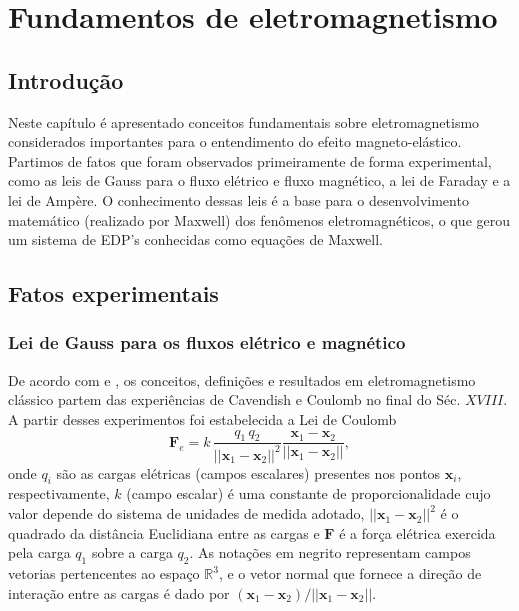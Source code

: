 \chapter{Fundamentos de eletromagnetismo}\label{sec.fund_eletr}

\section{Introdução}
Neste cap\'itulo \'e apresentado conceitos fundamentais sobre eletromagnetismo considerados importantes para o entendimento do efeito magneto-el\'astico. Partimos de fatos que foram observados primeiramente de forma experimental, como as leis de Gauss para o fluxo el\'etrico e fluxo magn\'etico, a lei de Faraday e a lei de Amp\`ere. O conhecimento dessas leis \'e a base para o desenvolvimento matem\'atico (realizado por Maxwell) dos fen\^omenos eletromagn\'eticos, o que gerou um sistema de EDP's conhecidas como equa\c{c}\~oes de Maxwell.    


\section{Fatos experimentais}

\subsection{Lei de Gauss para os fluxos elétrico e magnético}\label{sec.lei_gauss}
De acordo com \cite{jackson_classical_1999} e \cite{sommerfeld_52} , os conceitos, definições e resultados em eletromagnetismo clássico partem das experiências de Cavendish e Coulomb no final do Séc. $XVIII$. A partir desses experimentos foi estabelecida a Lei de Coulomb
\begin{equation}\label{eq.forc_elet}
\textbf{F}_e=k\,\frac{q_1\,q_2}{||\textbf{x}_1-\textbf{x}_2||^2}\frac{\textbf{x}_1-\textbf{x}_2}{||\textbf{x}_1-\textbf{x}_2||},
\end{equation}
onde $q_i$ são as cargas elétricas (campos escalares) presentes nos pontos $\textbf{x}_i$, respectivamente, $k$ (campo escalar) é uma constante de proporcionalidade cujo valor depende do sistema de unidades de medida adotado, $||\textbf{x}_1-\textbf{x}_2||^2$ é o quadrado da distância Euclidiana entre as cargas e $\textbf{F}$ é a força elétrica exercida pela carga $q_1$ sobre a carga $q_2$. As notações em negrito representam campos vetorias pertencentes ao espaço $\mathbb{R}^3$, e o vetor normal que fornece a direção de interação entre as cargas é dado por $(\textbf{x}_1-\textbf{x}_2)/||\textbf{x}_1-\textbf{x}_2||$.

